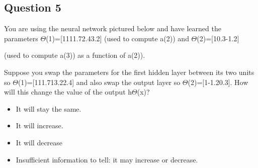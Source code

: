 \subsection*{Question 5}

You are using the neural network pictured below and have learned the parameters 
$\Theta$(1)=[1111.72.43.2] 
(used to compute a(2)) and $\Theta$(2)=[10.3-1.2] 

(used to compute a(3)) as a function of a(2)). 

Suppose you swap the parameters for the first hidden layer between its two units so $\Theta$(1)=[111.713.22.4] and also swap the output layer so $\Theta$(2)=[1-1.20.3]. How will this change the value of the output h$\Theta$(x)?

\begin{itemize}
	
	\item It will stay the same.
	
	\item It will increase.
	
	\item It will decrease
	
	\item Insufficient information to tell: it may increase or decrease.
	
\end{itemize}
